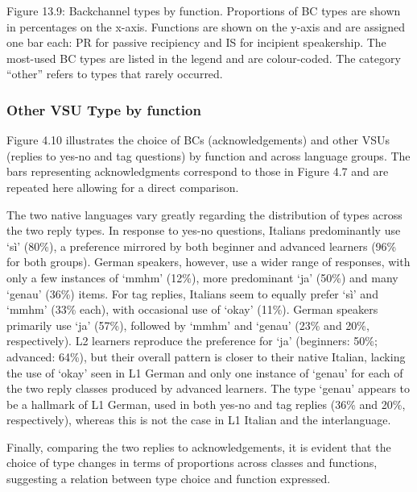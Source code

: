 \begin{stylecaption}
Figure 13.9: Backchannel types by function. Proportions of BC types are shown in percentages on the x-axis. Functions are shown on the y-axis and are assigned one bar each: PR for passive recipiency and IS for incipient speakership. The most-used BC types are listed in the legend and are colour-coded. The category “other” refers to types that rarely occurred.
\end{stylecaption}

\subsubsection[Other VSU Type by function]{Other VSU Type by function}
\hypertarget{Toc191305956}{}\begin{styleStandard}
Figure 4.10 illustrates the choice of BCs (acknowledgements) and other VSUs (replies to yes-no and tag questions) by function and across language groups. The bars representing acknowledgments correspond to those in Figure 4.7 and are repeated here allowing for a direct comparison.
\end{styleStandard}

\begin{styleStandard}
The two native languages vary greatly regarding the distribution of types across the two reply types. In response to yes-no questions, Italians predominantly use ‘sì’ (80\%), a preference mirrored by both beginner and advanced learners (96\% for both groups). German speakers, however, use a wider range of responses, with only a few instances of ‘mmhm’ (12\%), more predominant ‘ja’ (50\%) and many ‘genau’ (36\%) items. For tag replies, Italians seem to equally prefer ‘sì’ and ‘mmhm’ (33\% each), with occasional use of ‘okay’ (11\%). German speakers primarily use ‘ja’ (57\%), followed by ‘mmhm’ and ‘genau’ (23\% and 20\%, respectively). L2 learners reproduce the preference for ‘ja’ (beginners: 50\%; advanced: 64\%), but their overall pattern is closer to their native Italian, lacking the use of ‘okay’ seen in L1 German and only one instance of ‘genau’ for each of the two reply classes produced by advanced learners. The type ‘genau’ appears to be a hallmark of L1 German, used in both yes-no and tag replies (36\% and 20\%, respectively), whereas this is not the case in L1 Italian and the interlanguage.
\end{styleStandard}

\begin{styleStandard}
Finally, comparing the two replies to acknowledgements, it is evident that the choice of type changes in terms of proportions across classes and functions, suggesting a relation between type choice and function expressed.
\end{styleStandard}

